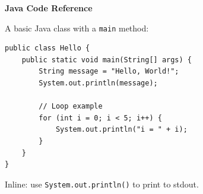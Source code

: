 \documentclass[11pt]{article}
\begin{document}
\centerline{\Large\bf Java Code Reference}\par
\bigskip

A basic Java class with a \lstinline{main} method:

\begin{lstlisting}
public class Hello {
    public static void main(String[] args) {
        String message = "Hello, World!";
        System.out.println(message);

        // Loop example
        for (int i = 0; i < 5; i++) {
            System.out.println("i = " + i);
        }
    }
}
\end{lstlisting}

Inline: use \lstinline{System.out.println()} to print to stdout.
\end{document}
